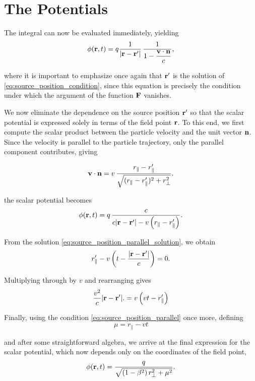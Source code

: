 \documentclass[12pt]{article}
\begin{document}
\section{The Potentials }


The integral can now be evaluated immediately, yielding
\[
  \phi(\vb r,t)
  =
  q
  \frac{
    1
  }{
    \abs{\vb r-\vb r'}
  }
  \,
  \frac{
    1
  }{
    1-\dfrac{\vb v\cdot\vb n}{c}
  },
\]

where it is important to emphasize once again that $\vb r'$ is the solution of
\eqref{eq:source_position_condition}, since this equation is precisely the
condition under which the argument of the function $\vb F$ vanishes.

We now eliminate the dependence on the source position $\vb r'$ so that the
scalar potential is expressed solely in terms of the field point $\vb r$. To
this end, we first compute the scalar product between the particle velocity and
the unit vector $\vb n$. Since the velocity is parallel to the particle
trajectory, only the parallel component contributes, giving

\[
  \vb v\cdot\vb n
  =
  v\,
  \frac{
    r_\parallel-r'_\parallel
  }{
    \sqrt{
      (r_\parallel-r'_\parallel)^2+r_\perp^2
    }
  }.
\]

 the scalar potential becomes
\[
  \phi(\vb r,t)
  =
  q\,
  \frac{
    c
  }{
    c\abs{\vb r-\vb r'}
    -
    v\left(
      r_\parallel-r'_\parallel
    \right)
  }.
\]

From the solution \eqref{eq:source_position_parallel_solution}, we obtain
\[
  r'_\parallel
  -
  v
  \left(
    t
    -
    \frac{\abs{\vb r-\vb r'}}{c}
  \right)
  =
  0.
\]

Multiplying through by $v$ and rearranging gives
\[
  \frac{v^2}{c}
  \abs{\vb r-\vb r'}.
=  v\left(vt-r'_\parallel\right)
\]

Finally, using the condition \eqref{eq:source_position_parallel} once more, defining
\[ \mu = r_\parallel - vt \]

and after some straightforward algebra, we arrive at the final expression for the
scalar potential, which now depends only on the coordinates of the field point,
\begin{equation}
  \phi(\vb r,t)
  =
  \frac{
    q
  }{
    \sqrt{
      \left(1-\beta^2\right)r_\perp^2
      +
      \mu^2
    }
  }.
  \label{eq:scalar_potential_uniform_motion}
\end{equation}
\end{document}
